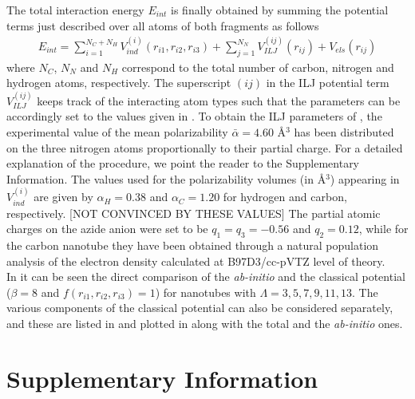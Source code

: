 \documentclass[utf8]{article}
\begin{document}
The total interaction energy $E_{int}$ is finally obtained by summing the potential terms just described over all atoms of both fragments as follows
%
\begin{align}
    E_{int} = \sum_{i=1}^{N_C + N_H} V^{(i)}_{ind}(r_{i1},r_{i2},r_{i3}) +
              \sum_{j=1}^{N_N} V_{ILJ}^{(ij)}(r_{ij}) + V_{els}(r_{ij})
\end{align}
%
where $N_C$, $N_N$ and $N_H$ correspond to the total number of carbon, nitrogen and hydrogen atoms, respectively.
The superscript $(ij)$ in the ILJ potential term $V_{ILJ}^{(ij)}$ keeps track of the interacting atom types such that the parameters can be accordingly set to the values given in .
To obtain the ILJ parameters of , the experimental value of the mean polarizability $\bar{\alpha} = 4.60$ \AA$^3$\cite{Borgne1999} has been distributed on the three nitrogen atoms proportionally to their partial charge. For a detailed explanation of the procedure, we point the reader to the Supplementary Information.
The values used for the polarizability volumes (in \AA$^{3}$) appearing in $V^(i)_{ind}$ are given by $\alpha_H = 0.38$ and $\alpha_C = 1.20$ for hydrogen and carbon, respectively. [NOT CONVINCED BY THESE VALUES]
The partial atomic charges on the azide anion were set to be $q_1 = q_3 = -0.56$ and $q_2 = 0.12$, while for the carbon nanotube they have been obtained through a natural population analysis\cite{Reed1985a} of the electron density calculated at B97D3/cc-pVTZ level of theory.\\

In  it can be seen the direct comparison of the \emph{ab-initio} and the classical potential ($\beta = 8$ and $f(r_{i1},r_{i2},r_{i3}) = 1$) for nanotubes with $\Lambda = 3,5,7,9,11,13$. 
The various components of the classical potential can also be considered separately, and these are listed in  and plotted in  along with the total and the \emph{ab-initio} ones.

\clearpage




\clearpage
\section{Supplementary Information}
\end{document}
